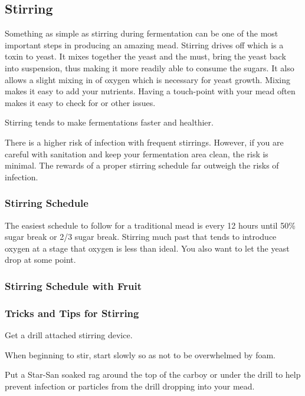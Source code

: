 \documentclass{article}
\begin{document}
 \subsection{Stirring}
  Something as simple as stirring during fermentation can be one of the most important steps in producing an amazing mead. Stirring drives off  which is a 
  toxin to yeast. It mixes together the yeast and the must, bring the yeast back into suspension, thus making it more readily able to consume the sugars. It also
  allows a slight mixing in of oxygen which is necessary for yeast growth. Mixing makes it easy to add your nutrients. Having a touch-point with your mead often
  makes it easy to check for  or other issues.

  Stirring tends to make fermentations faster and healthier. 

  There is a higher risk of infection with frequent stirrings. However, if you are careful with sanitation and keep your fermentation area clean, the risk is minimal.
  The rewards of a proper stirring schedule far outweigh the risks of infection.

  \subsubsection{Stirring Schedule}
   The easiest schedule to follow for a traditional mead is every 12 hours until 50\% sugar break or 2/3 sugar break. Stirring much past that tends to introduce
   oxygen at a stage that oxygen is less than ideal. You also want to let the yeast drop at some point.

  \subsubsection{Stirring Schedule with Fruit}

  \subsubsection{Tricks and Tips for Stirring}
   Get a drill attached stirring device.

   When beginning to stir, start slowly so as not to be overwhelmed by foam. 

   Put a Star-San soaked rag around the top of the carboy or under the drill to help prevent infection or particles from the drill dropping into your mead.
\end{document}
